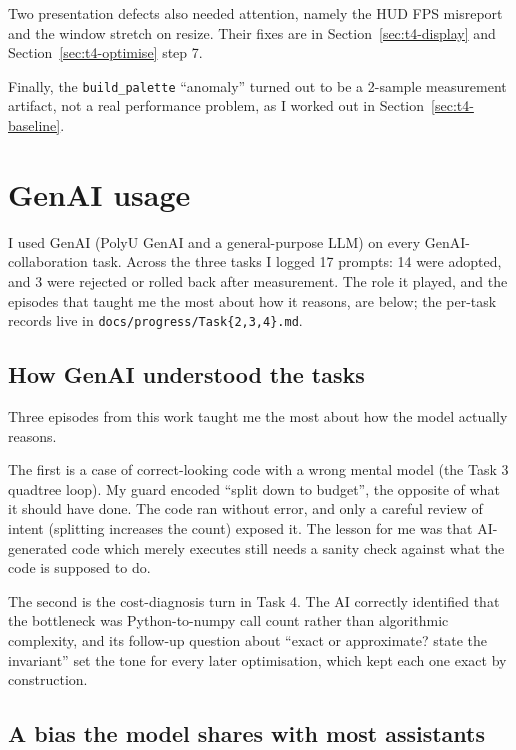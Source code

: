\documentclass[11pt,a4paper]{article}
\begin{document}
Two presentation defects also needed attention, namely the HUD FPS misreport and
the window stretch on resize. Their fixes are in
Section~\ref{sec:t4-display} and Section~\ref{sec:t4-optimise} step 7.

Finally, the \texttt{build\_palette} ``anomaly'' turned out to be a 2-sample
measurement artifact, not a real performance problem, as I worked out in
Section~\ref{sec:t4-baseline}.

\FloatBarrier
\FloatBarrier
\section{GenAI usage}

I used GenAI (PolyU GenAI and a general-purpose LLM) on every
GenAI-collaboration task. Across the three tasks I logged 17 prompts: 14 were
adopted, and 3 were rejected or rolled back after measurement. The role it
played, and the episodes that taught me the most about how it reasons, are
below; the per-task records live in \texttt{docs/progress/Task\{2,3,4\}.md}.

\FloatBarrier
\FloatBarrier
\subsection{How GenAI understood the tasks}

Three episodes from this work taught me the most about how the model actually
reasons.

The first is a case of correct-looking code with a wrong mental model (the Task 3
quadtree loop). My guard encoded ``split down to budget'', the opposite of what
it should have done. The code ran without error, and only a careful review of
intent (splitting increases the count) exposed it. The lesson for me was that
AI-generated code which merely executes still needs a sanity check against what
the code is supposed to do.

The second is the cost-diagnosis turn in Task 4. The AI correctly identified that
the bottleneck was Python-to-numpy call count rather than algorithmic
complexity, and its follow-up question about ``exact or approximate? state the
invariant'' set the tone for every later optimisation, which kept each one exact
by construction.

\FloatBarrier
\FloatBarrier
\subsection{A bias the model shares with most assistants}
\end{document}
